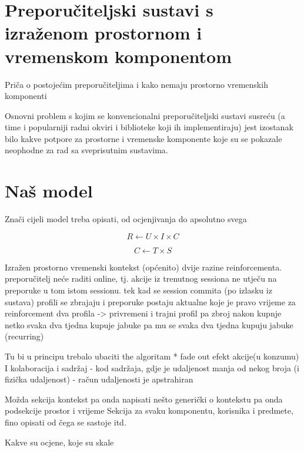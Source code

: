 \documentclass[times, utf8, diplomski, numeric]{fer}
\begin{document}
\section{Preporučiteljski sustavi s izraženom prostornom i vremenskom
komponentom}

Priča o postojećim preporučiteljima i kako nemaju prostorno vremenskih
komponenti 

Osnovni problem s kojim se konvencionalni preporučiteljski sustavi susreću (a
time i popularniji radni okviri i biblioteke koji ih implementiraju) jest
izostanak bilo kakve potpore za prostorne i vremenske komponente koje
su se pokazale neophodne za rad sa sveprisutnim sustavima.

\section{Naš model}
Znači cijeli model treba opisati, od ocjenjivanja do apsolutno svega

\begin{equation}
\label{eq:DefModel}
	R \leftarrow U \times I \times C
\end{equation}

\begin{equation}
\label{eq:Context}
	C \leftarrow T \times S
\end{equation}

Izražen prostorno vremenski kontekst (općenito)
dvije razine reinforcementa. preporučitelj neće raditi online, tj. akcije iz
trenutnog sessiona ne utječu na preporuke u tom istom sessionu. tek kad se
session commita (po izlasku iz sustava) profili se zbrajaju i preporuke postaju
aktualne koje je pravo vrijeme za reinforcement dva profila -> privremeni i
trajni profil pa zbroj nakon kupnje netko svaka dva tjedna kupuje jabuke pa mu
se svaka dva tjedna kupuju jabuke (recurring)


Tu bi u principu trebalo ubaciti the algoritam
* fade out efekt
akcije(u konzumu)
I kolaboracija i sadržaj
- kod sadržaja, gdje je udaljenost manja od nekog broja (i fizička udaljenost)
- račun udaljenosti je apstrahiran

Možda sekcija kontekst pa onda napisati nešto generički o kontekstu pa onda
podsekcije prostor i vrijeme
Sekcija za svaku komponentu, korisnika i predmete, fino opisati od čega se
sastoje itd.

Kakve su ocjene, koje su skale
\end{document}
